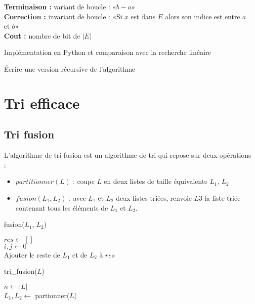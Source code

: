\noindent\textbf{Terminaison :} variant de boucle : «$b-a$»\\
\textbf{Correction :} invariant de boucle : «Si $x$ est dans $E$ alors son indice est entre $a$ et $b$»\\
\textbf{Cout :} nombre de bit de $|E|$

\begin{impl}
	Implémentation en Python et comparaison avec la recherche linéaire
\end{impl}

\begin{exercise}
	Écrire une version récursive de l'algorithme
\end{exercise}

\section{Tri efficace}

\subsection{Tri fusion}

\begin{definition}
	L'algorithme de tri fusion est un algorithme de tri qui repose sur deux opérations : \begin{itemize}
		\item $partitionner(L)$ : coupe $L$ en deux listes de taille équivalente $L_1$, $L_2$
		\item $fusion(L_1, L_2)$ : avec $L_1$ et $L_2$ deux listes triées, renvoie $L3$ la liste triée contenant tous les éléments de $L_1$ et $L_2$.
	\end{itemize}
\end{definition}

\begin{algorithm}[H]
	\caption{fusion($L_1$, $L_2$)}
	$res \gets []$\\
	$i,j \gets 0$\\
	Ajouter le reste de $L_1$ et de $L_2$ à $res$\\
\end{algorithm}

\begin{algorithm}[H]
	\caption{tri\_fusion($L$)}
	$n \gets |L|$\\
	$L_1, L_2 \gets$ partionner($L$)\\
\end{algorithm}

